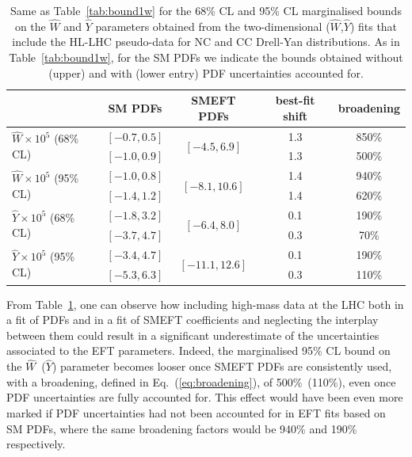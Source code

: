\documentclass[withindex,glossary]{cam-thesis}
\begin{document}
\begin{table}
 \renewcommand{\arraystretch}{1.40}
  \centering
  \begin{tabular}{l|c|c|c|c}
    & SM PDFs & SMEFT PDFs  & best-fit shift  & broadening  \\
    \hline
    \multirow{2}{*}{ $\hat{W}\times 10^5$ (68\% CL)} & $[-0.7, 0.5]$ & \multirow{2}{*}{$[-4.5, 6.9]$}  & 1.3 & 850\% \\
      & $[-1.0, 0.9]$ &  & 1.3  & 500\% \\
    \midrule
    \multirow{2}{*}{$\hat{W}\times 10^5$ (95\% CL)} & $[-1.0, 0.8]$ & \multirow{2}{*}{$[-8.1, 10.6]$} & 1.4 & 940\%\\
      & $[-1.4, 1.2]$ &  &  1.4 & 620\%  \\
   \hline
   \multirow{2}{*}{$\hat{Y}\times 10^5$ (68\% CL)} & $[-1.8, 3.2]$ & \multirow{2}{*}{$[-6.4, 8.0]$} & 0.1 & 190\% \\
       & $[-3.7, 4.7] $ &  & 0.3  & 70\% \\
   \midrule
   \multirow{2}{*}{$\hat{Y}\times 10^5$ (95\% CL)} & $[-3.4, 4.7] $ & \multirow{2}{*}{$[-11.1, 12.6]$} & 0.1 & 190\%\\
   & $[-5.3, 6.3] $ &  & 0.3  & 110\% \\
    \hline
  \end{tabular}
  \caption{ \label{tab:hlbounds}\small
    Same as Table~\ref{tab:bound1w} for the
 68\% CL and 95\% CL
    marginalised bounds on the $\hat{W}$ and $\hat{Y}$
    parameters obtained from the two-dimensional ($\hat{W}$,$\hat{Y}$)
    fits that include the HL-LHC pseudo-data for NC and CC
    Drell-Yan distributions.
    As in Table~\ref{tab:bound1w},
    for the SM PDFs we indicate the bounds obtained without (upper)
    and with (lower entry) PDF uncertainties accounted for.
}
\end{table}

From Table~\ref{tab:hlbounds},
one can observe how including high-mass data at the LHC both in a fit of PDFs and
in a fit of SMEFT coefficients and neglecting the interplay between
them could result in a significant underestimate
of the uncertainties associated to the EFT parameters.
%
Indeed, the marginalised 95\% CL bound on the $\hat{W}$~($\hat{Y}$) parameter becomes looser
once SMEFT PDFs are consistently used, with a broadening, defined in Eq.~(\ref{eq:broadening}),
of 500\%~(110\%), even once PDF uncertainties are fully accounted for. 
%
This effect would have been even more marked if PDF uncertainties had not
been accounted for in EFT fits based on SM PDFs,
where the same broadening factors would be 940\% and 190\%
respectively.
\end{document}
